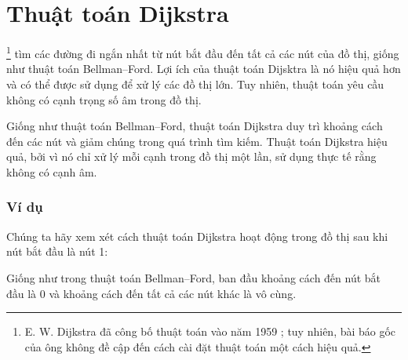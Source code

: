 \section{Thuật toán Dijkstra}


\footnote{E. W. Dijkstra đã công bố thuật toán vào năm 1959 \cite{dij59};
tuy nhiên, bài báo gốc của ông không đề cập đến cách cài đặt thuật toán một cách hiệu quả.}
tìm các đường đi ngắn nhất từ nút bắt đầu đến tất cả các nút của đồ thị,
giống như thuật toán Bellman–Ford.
Lợi ích của thuật toán Dijsktra là
nó hiệu quả hơn và có thể được sử dụng để
xử lý các đồ thị lớn.
Tuy nhiên, thuật toán yêu cầu không có
cạnh trọng số âm trong đồ thị.

Giống như thuật toán Bellman–Ford,
thuật toán Dijkstra duy trì khoảng cách
đến các nút và giảm chúng trong quá trình tìm kiếm.
Thuật toán Dijkstra hiệu quả, bởi vì
nó chỉ xử lý
mỗi cạnh trong đồ thị một lần, sử dụng thực tế
rằng không có cạnh âm.

\subsubsection{Ví dụ}

Chúng ta hãy xem xét cách thuật toán Dijkstra
hoạt động trong đồ thị sau khi
nút bắt đầu là nút 1:
\begin{center}
\end{center}
Giống như trong thuật toán Bellman–Ford,
ban đầu khoảng cách đến nút bắt đầu là 0
và khoảng cách đến tất cả các nút khác là vô cùng.


